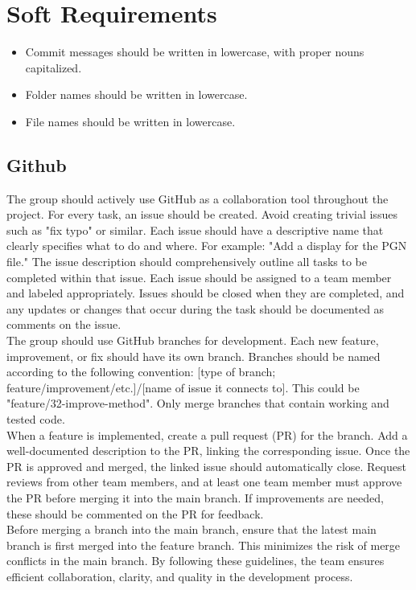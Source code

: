 \chapter{Soft Requirements}

\begin{itemize}
    \item Commit messages should be written in lowercase, with proper nouns capitalized.
    \item Folder names should be written in lowercase.
    \item File names should be written in lowercase.
\end{itemize}

\section{Github}
The group should actively use GitHub as a collaboration tool throughout the project. For every task, an issue should be created. Avoid creating trivial issues such as "fix typo" or similar. Each issue should have a descriptive name that clearly specifies what to do and where. For example: "Add a display for the PGN file." The issue description should comprehensively outline all tasks to be completed within that issue. Each issue should be assigned to a team member and labeled appropriately. Issues should be closed when they are completed, and any updates or changes that occur during the task should be documented as comments on the issue. \\

The group should use GitHub branches for development. Each new feature, improvement, or fix should have its own branch. Branches should be named according to the following convention: [type of branch; feature/improvement/etc.]/[name of issue it connects to]. This could be "feature/32-improve-method". Only merge branches that contain working and tested code. \\

When a feature is implemented, create a pull request (PR) for the branch. Add a well-documented description to the PR, linking the corresponding issue. Once the PR is approved and merged, the linked issue should automatically close. Request reviews from other team members, and at least one team member must approve the PR before merging it into the main branch. If improvements are needed, these should be commented on the PR for feedback. \\

Before merging a branch into the main branch, ensure that the latest main branch is first merged into the feature branch. This minimizes the risk of merge conflicts in the main branch. By following these guidelines, the team ensures efficient collaboration, clarity, and quality in the development process.\\

